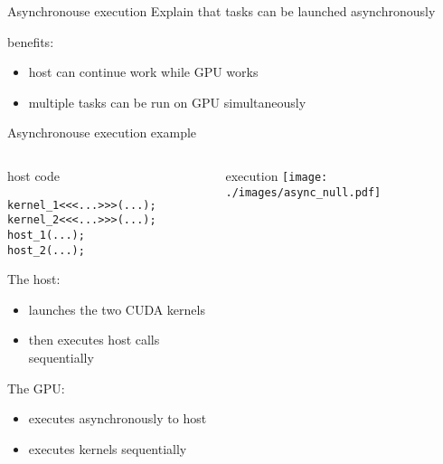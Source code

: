 
\begin{frame}[fragile]{Asynchronouse execution}
    Explain that tasks can be launched asynchronously

    benefits:
    \begin{itemize}
        \item host can continue work while GPU works
        \item multiple tasks can be run on GPU simultaneously
    \end{itemize}

\end{frame}

\begin{frame}[fragile]{Asynchronouse execution example}
    \begin{columns}[T]
        \begin{column}{0.5\textwidth}
            \begin{codecolumn}{host code}
                \begin{lstlisting}[style=boxcudatiny]
kernel_1<<<...>>>(...);
kernel_2<<<...>>>(...);
host_1(...);
host_2(...);
                \end{lstlisting}
            \end{codecolumn}
        The host:
        \begin{itemize}
            \item launches the two CUDA kernels
            \item then executes host calls sequentially 
        \end{itemize}
        The GPU:
        \begin{itemize}
            \item executes asynchronously to host
            \item executes kernels sequentially
        \end{itemize}
        \end{column}
        \begin{column}{0.5\textwidth}
            \begin{info}{execution}
                \texttt{[image: ./images/async\_null.pdf]}
            \end{info}
        \end{column}
    \end{columns}
\end{frame}

